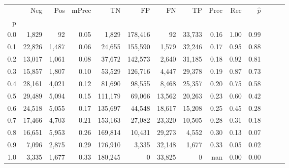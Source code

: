 \begin{tabular}{rrrrrrrrrrrrrr}
\toprule
{} &     Neg &    Pos & mPrec &       TN &       FP &      FN &      TP &  Prec &   Rec & $\hat{p}$ \\
p   &         &        &       &          &          &         &         &       &       &           \\
\midrule
0.0 &   1,829 &     92 &  0.05 &    1,829 &  178,416 &      92 &  33,733 &  0.16 &  1.00 &      0.99 \\
0.1 &  22,826 &  1,487 &  0.06 &   24,655 &  155,590 &   1,579 &  32,246 &  0.17 &  0.95 &      0.88 \\
0.2 &  13,017 &  1,061 &  0.08 &   37,672 &  142,573 &   2,640 &  31,185 &  0.18 &  0.92 &      0.81 \\
0.3 &  15,857 &  1,807 &  0.10 &   53,529 &  126,716 &   4,447 &  29,378 &  0.19 &  0.87 &      0.73 \\
0.4 &  28,161 &  4,021 &  0.12 &   81,690 &   98,555 &   8,468 &  25,357 &  0.20 &  0.75 &      0.58 \\
0.5 &  29,489 &  5,094 &  0.15 &  111,179 &   69,066 &  13,562 &  20,263 &  0.23 &  0.60 &      0.42 \\
0.6 &  24,518 &  5,055 &  0.17 &  135,697 &   44,548 &  18,617 &  15,208 &  0.25 &  0.45 &      0.28 \\
0.7 &  17,466 &  4,703 &  0.21 &  153,163 &   27,082 &  23,320 &  10,505 &  0.28 &  0.31 &      0.18 \\
0.8 &  16,651 &  5,953 &  0.26 &  169,814 &   10,431 &  29,273 &   4,552 &  0.30 &  0.13 &      0.07 \\
0.9 &   7,096 &  2,875 &  0.29 &  176,910 &    3,335 &  32,148 &   1,677 &  0.33 &  0.05 &      0.02 \\
1.0 &   3,335 &  1,677 &  0.33 &  180,245 &        0 &  33,825 &       0 &   nan &  0.00 &      0.00 \\
\bottomrule
\end{tabular}
